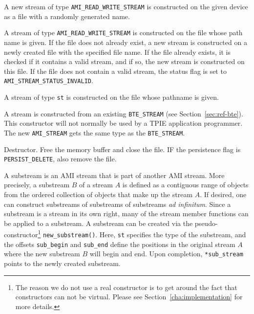   \btabb
  
   {A new
    stream of type \lstinline|AMI_READ_WRITE_STREAM| is constructed on
    the given device as a file with a randomly generated name.}
 
   {A stream of
    type \lstinline|AMI_READ_WRITE_STREAM| is constructed on the file
    whose path name is given. If the file does not already exist, a
    new stream is constructed on a newly created file with the
    specified file name. If the file already exists, it is checked if
    it contains a valid stream, and if so, the new stream is
    constructed on this file. If the file does not contain a valid
    stream, the status flag is set to
    \lstinline|AMI_STREAM_STATUS_INVALID|.}
  
   {A stream of type \lstinline|st| is
    constructed on the file whose pathname is given.}
  
   {A stream is
    constructed from an existing \lstinline|BTE_STREAM| (see
    Section~\ref{sec:ref-bte}). This constructor will not normally be
    used by a TPIE application programmer. The new
    \lstinline|AMI_STREAM| gets the same type as the
    \lstinline|BTE_STREAM|.}

     {Destructor. Free the memory
    buffer and close the file. IF the persistence flag is
    \lstinline|PERSIST_DELETE|, also remove the file.}
  
   {A 
    substream is an AMI stream that is part of another AMI stream.
    More precisely, a substream $B$ of a stream $A$ is defined as a
    contiguous range of objects from the ordered collection of objects
    that make up the stream $A$.  If desired, one can construct
    substreams of substreams of substreams {\em ad infinitum}. Since a
    substream is a stream in its own right, many of the stream member
    functions can be applied to a substream. A substream can be
    created via the pseudo-constructor\footnote{The reason we do not
      use a real constructor is to get around the fact that
      constructors can not be virtual. Please see
      Section~\ref{cha:implementation} for more details.}
    \lstinline|new_substream()|. Here, \lstinline|st| specifies the
    type of the substream, and the offsets \lstinline|sub_begin| and
    \lstinline|sub_end| define the positions in the original stream
    $A$ where the new substream $B$ will begin and end. Upon
    completion, \lstinline|*sub_stream| points to the newly created
    substream.}

